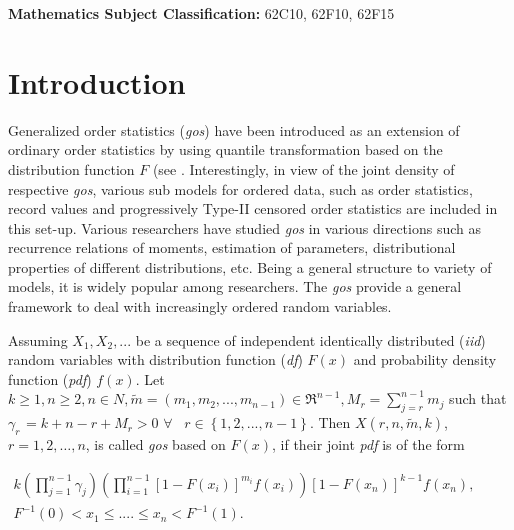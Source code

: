 \documentclass[11pt,a4paper]{article}
\numberwithin{equation}{section}
\begin{document}
\noindent

\textbf{Mathematics Subject Classification:} 62C10, 62F10, 62F15\\

	\section{Introduction}

	Generalized order statistics (\textit{gos}) have been introduced as an extension of ordinary order statistics by using quantile transformation based on the distribution function $F$ (see \cite{kamps1995concept}. Interestingly, in view of the joint density of respective \textit{gos}, various sub models for ordered data, such as order statistics, record values and progressively Type-II censored order statistics are included in this set-up. Various researchers have studied \textit{gos} in various directions such as recurrence relations of moments, estimation of parameters, distributional properties of different distributions, etc. Being a general structure to variety of models, it is widely popular among researchers. The \textit{gos} provide a general framework to deal with increasingly ordered random variables. \par

	Assuming $X_{1} ,X_{2} ,...$ be a sequence of independent identically distributed (\textit{iid}) random variables with distribution function (\textit{df}) $F\left(x\right)$ and probability density function (\textit{pdf}) $f(x)$. Let $k\ge 1,n\ge 2,n\in N,\tilde{m}=\left(m_{1} ,m_{2} ,...,m_{n-1} \right)\in \Re ^{n-1} ,M_{r} =\sum_{j=r}^{n-1}m_{j}$ such that $\gamma _{r\,}=k+n-r+M_{r} >0$ $\forall \, \, \, \, \, r\in \left\{1,2,...,n-1\right\}$. Then $X\left(r,n,\tilde{m},k\right)$, $r=1,2,\ldots,n$, is called \textit{gos} based on $F\left(x\right)$, if their  joint \textit{pdf} is of the form

	\begin{eqnarray}\label{eq1}

		k\left(\prod _{j=1}^{n-1}\gamma _{j}  \right)\left(\prod _{i=1}^{n-1}\left[1-F\left(x_{i} \right)\right]^{m_{i} } f\left(x_{i} \right) \right)\left[1-F\left(x_{n} \right)\right]^{k-1} f\left(x_{n} \right)\nonumber,\, \, \, \, \, \, \, \, \, \, \, \, \, \, \, \, \,\\

		F^{-1} \left(0\right)<x_{1} \le ....\le x_{n} <F^{-1} \left(1\right).

	\end{eqnarray}
\end{document}
